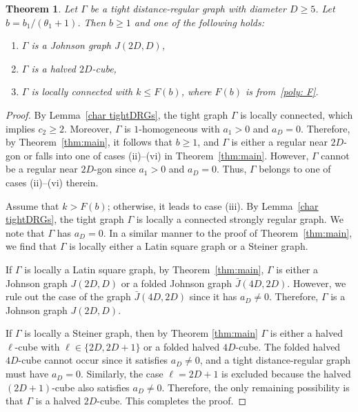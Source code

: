 \documentclass[11pt]{article}
\newtheorem{theorem}[theo]{Theorem}
\theoremstyle{definition}
\numberwithin{equation}{section}
\numberwithin{equation}{section}
\begin{document}
\begin{theorem}\label{tight corollary}
Let $\Gamma$ be a tight distance-regular graph with diameter $D \geqslant 5$. Let $b=b_1/(\theta_1 +1)$. Then $b \geqslant 1$ and one of the following holds:
\begin{enumerate}[\normalfont(i)]
  \item $\Gamma$ is a Johnson graph $J(2D,D)$,
  \item $\Gamma$ is a halved $2D$-cube,
  \item $\Gamma$ is locally connected with $k \leqslant F(b)$, where $F(b)$ is from~\eqref{poly: F}.
\end{enumerate}
\end{theorem}
\begin{proof}
By Lemma~\ref{char tightDRGs}, the tight graph $\Gamma$ is locally connected, which implies $c_2\geqslant 2$.
Moreover, $\Gamma$ is $1$-homogeneous with $a_1 > 0$ and $a_D=0$.
Therefore, by Theorem~\ref{thm:main}, it follows that $b\geqslant 1$, and $\Gamma$ is either a regular near $2D$-gon or falls into one of cases (ii)--(vi) in Theorem~\ref{thm:main}.
However, $\Gamma$ cannot be a regular near $2D$-gon since $a_1 > 0$ and $a_D=0$.
Thus, $\Gamma$ belongs to one of cases (ii)--(vi) therein.

Assume that $k > F(b)$; otherwise, it leads to case (iii).
By Lemma~\ref{char tightDRGs}, the tight graph $\Gamma$ is locally a connected strongly regular graph.
We note that $\Gamma$ has $a_D=0$.
In a similar manner to the proof of Theorem~\ref{thm:main}, we find that $\Gamma$ is locally either a Latin square graph or a Steiner graph.

If $\Gamma$ is locally a Latin square graph, by Theorem~\ref{thm:main}, $\Gamma$ is either a Johnson graph $J(2D,D)$ or a folded Johnson graph $\bar{J}(4D,2D)$. 
However, we rule out the case of the graph $\bar{J}(4D,2D)$ since it has $a_D\ne 0$. 
Therefore, $\Gamma$ is a Johnson graph $J(2D,D)$.

If $\Gamma$ is locally a Steiner graph, then by Theorem \ref{thm:main} $\Gamma$ is either a halved $\ell$-cube with $\ell \in \{2D,2D+1\}$ or a folded halved $4D$-cube. The folded halved $4D$-cube cannot occur since it satisfies $a_D \ne 0$, and a tight distance-regular graph must have $a_D = 0$. Similarly, the case $\ell = 2D+1$ is excluded because the halved $(2D+1)$-cube also satisfies $a_D \ne 0$. Therefore, the only remaining possibility is that $\Gamma$ is a halved $2D$-cube. This completes the proof.
\end{proof}
\end{document}
